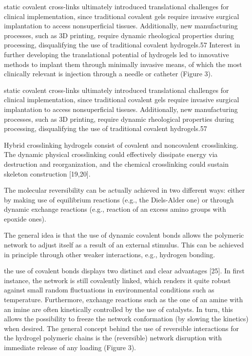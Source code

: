 static covalent cross-links ultimately introduced translational challenges for clinical implementation, since traditional covalent gels require invasive surgical implantation to access nonsuperficial tissues.  
Additionally, new manufacturing processes, such as 3D printing, require dynamic rheological properties during processing, disqualifying the use of traditional covalent  hydrogels.57  
Interest in further developing the translational potential of hydrogels led to innovative methods to implant them through minimally invasive means, of which the most clinically relevant is injection through a needle or catheter (Figure 3).

static covalent cross-links ultimately introduced translational challenges for clinical implementation, since traditional covalent gels require invasive surgical implantation to access nonsuperficial tissues.  
Additionally, new manufacturing processes, such as 3D printing, require dynamic rheological properties during processing, disqualifying the use of traditional covalent  hydrogels.57



Hybrid crosslinking hydrogels consist of covalent and noncovalent crosslinking\citep{xuRoleChemicalPhysical2018}. 
The dynamic physical crosslinking could effectively dissipate energy via destruction and reorganization, and the chemical crosslinking could sustain skeleton construction [19,20]\citep{xuRoleChemicalPhysical2018}. 

The molecular reversibility can be actually achieved in two different ways: either by making use of equilibrium reactions (e.g., the Diels-Alder one) or through dynamic exchange reactions (e.g., reaction of an excess amino groups with epoxide ones)\citep{picchioniHydrogelsBasedDynamic2018}.

The general idea is that the use of dynamic covalent bonds allows the polymeric network to adjust itself as a result of an external stimulus\citep{picchioniHydrogelsBasedDynamic2018}. 
This can be achieved in principle through other weaker interactions, e.g., hydrogen bonding\citep{picchioniHydrogelsBasedDynamic2018}. 

the use of covalent bonds displays two distinct and clear advantages [25]. 
In first instance, the network is still covalently linked, which renders it quite robust against small random fluctuations in environmental conditions such as temperature. 
Furthermore, exchange reactions such as the one of an amine with an imine are often kinetically controlled by the use of catalysts. 
In turn, this allows the possibility to freeze the network conformation (by slowing the kinetics) when desired\citep{picchioniHydrogelsBasedDynamic2018}. 
The general concept behind the use of reversible interactions for the hydrogel polymeric chains is the (reversible) network disruption with immediate release of any loading (Figure 3).

